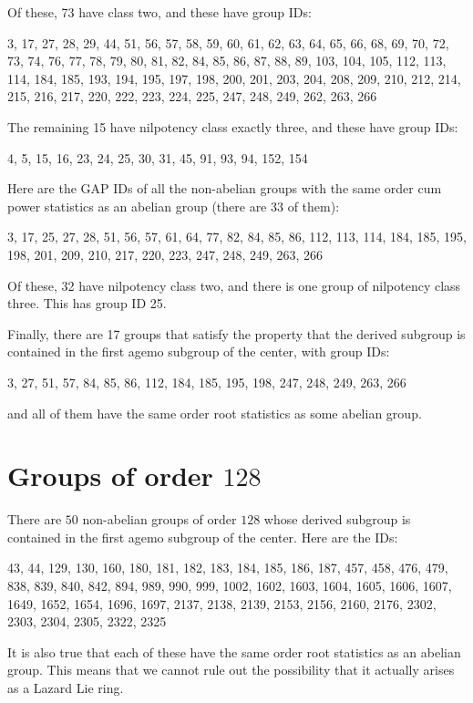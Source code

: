 \documentclass[10pt]{amsart}
\begin{document}
Of these, 73 have class two, and these have group IDs:

3, 17, 27, 28, 29, 44, 51, 56, 57, 58, 59, 60, 61, 62, 63, 64, 65, 66,
68, 69, 70, 72, 73, 74, 76, 77, 78, 79, 80, 81, 82, 84, 85, 86, 87,
88, 89, 103, 104, 105, 112, 113, 114, 184, 185, 193, 194, 195, 197,
198, 200, 201, 203, 204, 208, 209, 210, 212, 214, 215, 216, 217, 220,
222, 223, 224, 225, 247, 248, 249, 262, 263, 266

The remaining 15 have nilpotency class exactly three, and these have group IDs:

4, 5, 15, 16, 23, 24, 25, 30, 31, 45, 91, 93, 94, 152, 154

Here are the GAP IDs of all the non-abelian groups with the same order
cum power statistics as an abelian group (there are 33 of them):

3, 17, 25, 27, 28, 51, 56, 57, 61, 64, 77, 82, 84, 85, 86, 112, 113,
114, 184, 185, 195, 198, 201, 209, 210, 217, 220, 223, 247, 248, 249,
263, 266

Of these, 32 have nilpotency class two, and there is one group of
nilpotency class three. This has group ID 25.

Finally, there are 17 groups that satisfy the property that the
derived subgroup is contained in the first agemo subgroup of the
center, with group IDs:

3, 27, 51, 57, 84, 85, 86, 112, 184, 185, 195, 198, 247, 248, 249, 263, 266

and all of them have the same order root statistics as some abelian group.

\section{Groups of order $128$}

There are $50$ non-abelian groups of order $128$ whose derived
subgroup is contained in the first agemo subgroup of the center. Here
are the IDs:

43, 44, 129, 130, 160, 180, 181, 182, 183, 184, 185, 186, 187, 457,
458, 476, 479, 838, 839, 840, 842, 894, 989, 990, 999, 1002, 1602,
1603, 1604, 1605, 1606, 1607, 1649, 1652, 1654, 1696, 1697, 2137,
2138, 2139, 2153, 2156, 2160, 2176, 2302, 2303, 2304, 2305, 2322, 2325

It is also true that each of these have the same order root statistics
as an abelian group. This means that we cannot rule out the
possibility that it actually arises as a Lazard Lie ring.
\end{document}
